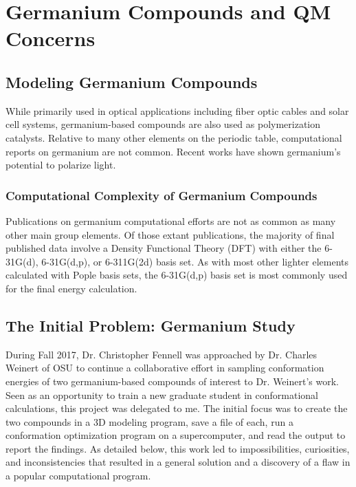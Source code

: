 \chapter{Germanium Compounds and QM Concerns}
\label{ch:Germanium}

\section{Modeling Germanium Compounds}

While primarily used in optical applications including fiber optic cables and solar cell systems, germanium-based compounds are also used as polymerization catalysts.
Relative to many other elements on the periodic table, computational reports on germanium are not common.
Recent works have shown germanium's potential to polarize light.


\subsection{Computational Complexity of Germanium Compounds}

Publications on germanium computational efforts are not as common as many other main group elements. 
Of those extant publications, the majority of final published data involve a Density Functional Theory (DFT) with either the 6-31G(d), 6-31G(d,p), or 6-311G(2d) basis set.\cite{GeCompStudy1}
As with most other lighter elements calculated with Pople basis sets, the 6-31G(d,p) basis set is most commonly used for the final energy calculation.\cite{Weinert1,Weinert2}

\section{The Initial Problem: Germanium Study}

During Fall 2017, Dr. Christopher Fennell was approached by Dr. Charles Weinert of OSU to continue a collaborative effort in sampling conformation energies of two germanium-based compounds of interest to Dr. Weinert's work. 
Seen as an opportunity to train a new graduate student in conformational calculations, this project was delegated to me.
The initial focus was to create the two compounds in a 3D modeling program, save a file of each, run a conformation optimization program on a supercomputer, and read the output to report the findings.
As detailed below, this work led to impossibilities, curiosities, and inconsistencies that resulted in a general solution and a discovery of a flaw in a popular computational program.

